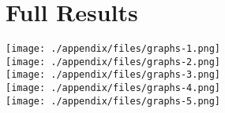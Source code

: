 \section{Full Results}
\pagebreak
\texttt{[image: ./appendix/files/graphs-1.png]}
\\
\texttt{[image: ./appendix/files/graphs-2.png]}
\\
\texttt{[image: ./appendix/files/graphs-3.png]}
\\
\texttt{[image: ./appendix/files/graphs-4.png]}
\\
\texttt{[image: ./appendix/files/graphs-5.png]}